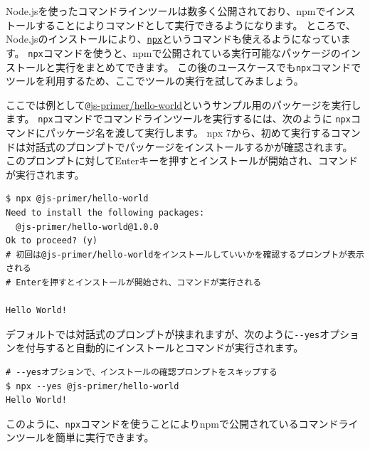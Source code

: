 Node.jsを使ったコマンドラインツールは数多く公開されており、npmでインストールすることによりコマンドとして実行できるようになります。
ところで、Node.jsのインストールにより、\href{https://docs.npmjs.com/cli/v8/commands/npx/}{\texttt{npx}}というコマンドも使えるようになっています。
\texttt{npx}コマンドを使うと、npmで公開されている実行可能なパッケージのインストールと実行をまとめてできます。
この後のユースケースでも\texttt{npx}コマンドでツールを利用するため、ここでツールの実行を試してみましょう。

ここでは例として\href{https://github.com/js-primer/hello-world}{\texttt @js-primer/hello-world}というサンプル用のパッケージを実行します。
\texttt{npx}コマンドでコマンドラインツールを実行するには、次のように
\texttt{npx}コマンドにパッケージ名を渡して実行します。
npx 7から、初めて実行するコマンドは対話式のプロンプトでパッケージをインストールするかが確認されます。
このプロンプトに対してEnterキーを押すとインストールが開始され、コマンドが実行されます。

\begin{lstlisting}
$ npx @js-primer/hello-world
Need to install the following packages:
  @js-primer/hello-world@1.0.0
Ok to proceed? (y)
# 初回は@js-primer/hello-worldをインストールしていいかを確認するプロンプトが表示される
# Enterを押すとインストールが開始され、コマンドが実行される

Hello World!
\end{lstlisting}

デフォルトでは対話式のプロンプトが挟まれますが、次のように\texttt{-\/-yes}オプションを付与すると自動的にインストールとコマンドが実行されます。

\begin{lstlisting}
# --yesオプションで、インストールの確認プロンプトをスキップする
$ npx --yes @js-primer/hello-world
Hello World!
\end{lstlisting}

このように、\texttt{npx}コマンドを使うことによりnpmで公開されているコマンドラインツールを簡単に実行できます。

